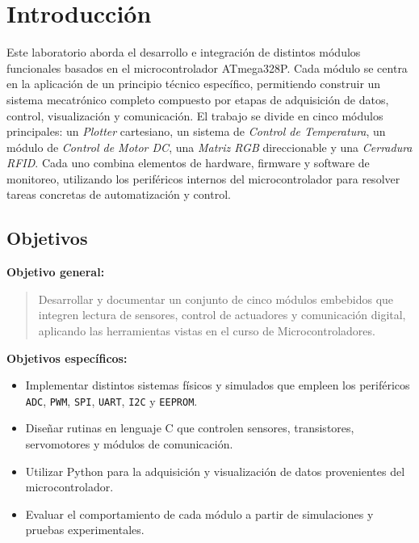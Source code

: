 \section{Introducción}

Este laboratorio aborda el desarrollo e integración de distintos módulos funcionales basados en el microcontrolador ATmega328P.  Cada módulo se centra en la aplicación de un principio técnico específico, permitiendo construir un sistema mecatrónico completo compuesto por etapas de adquisición de datos, control, visualización y comunicación.  
El trabajo se divide en cinco módulos principales: un \textit{Plotter} cartesiano, un sistema de \textit{Control de Temperatura}, un módulo de \textit{Control de Motor DC}, una \textit{Matriz RGB} direccionable y una \textit{Cerradura RFID}.  Cada uno combina elementos de hardware, firmware y software de monitoreo, utilizando los periféricos internos del microcontrolador para resolver tareas concretas de automatización y control.

\vspace{1em}

\subsection{Objetivos}

\textbf{Objetivo general:}
\begin{quote}
Desarrollar y documentar un conjunto de cinco módulos embebidos que integren lectura de sensores, control de actuadores y comunicación digital, aplicando las herramientas vistas en el curso de Microcontroladores.
\end{quote}

\textbf{Objetivos específicos:}
\begin{itemize}
    \item Implementar distintos sistemas físicos y simulados que empleen los periféricos \texttt{ADC}, \texttt{PWM}, \texttt{SPI}, \texttt{UART}, \texttt{I2C} y \texttt{EEPROM}.
    \item Diseñar rutinas en lenguaje C que controlen sensores, transistores, servomotores y módulos de comunicación.
    \item Utilizar Python para la adquisición y visualización de datos provenientes del microcontrolador.
    \item Evaluar el comportamiento de cada módulo a partir de simulaciones y pruebas experimentales.
\end{itemize}

\vspace{1em}

